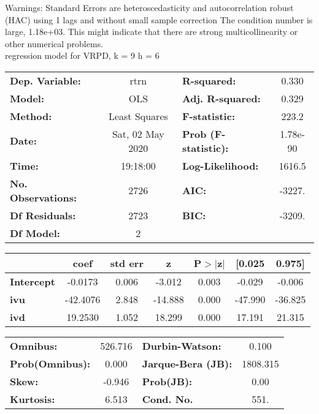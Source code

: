 Warnings: \newline
 [1] Standard Errors are heteroscedasticity and autocorrelation robust (HAC) using 1 lags and without small sample correction \newline
 [2] The condition number is large, 1.18e+03. This might indicate that there are \newline
 strong multicollinearity or other numerical problems.\\ 

regression model for VRPD, k = 9 h = 6\begin{center}
\begin{tabular}{lclc}
\toprule
\textbf{Dep. Variable:}    &       rtrn       & \textbf{  R-squared:         } &     0.330   \\
\textbf{Model:}            &       OLS        & \textbf{  Adj. R-squared:    } &     0.329   \\
\textbf{Method:}           &  Least Squares   & \textbf{  F-statistic:       } &     223.2   \\
\textbf{Date:}             & Sat, 02 May 2020 & \textbf{  Prob (F-statistic):} &  1.78e-90   \\
\textbf{Time:}             &     19:18:00     & \textbf{  Log-Likelihood:    } &    1616.5   \\
\textbf{No. Observations:} &        2726      & \textbf{  AIC:               } &    -3227.   \\
\textbf{Df Residuals:}     &        2723      & \textbf{  BIC:               } &    -3209.   \\
\textbf{Df Model:}         &           2      & \textbf{                     } &             \\
\bottomrule
\end{tabular}
\begin{tabular}{lcccccc}
                   & \textbf{coef} & \textbf{std err} & \textbf{z} & \textbf{P$> |$z$|$} & \textbf{[0.025} & \textbf{0.975]}  \\
\midrule
\textbf{Intercept} &      -0.0173  &        0.006     &    -3.012  &         0.003        &       -0.029    &       -0.006     \\
\textbf{ivu}       &     -42.4076  &        2.848     &   -14.888  &         0.000        &      -47.990    &      -36.825     \\
\textbf{ivd}       &      19.2530  &        1.052     &    18.299  &         0.000        &       17.191    &       21.315     \\
\bottomrule
\end{tabular}
\begin{tabular}{lclc}
\textbf{Omnibus:}       & 526.716 & \textbf{  Durbin-Watson:     } &    0.100  \\
\textbf{Prob(Omnibus):} &   0.000 & \textbf{  Jarque-Bera (JB):  } & 1808.315  \\
\textbf{Skew:}          &  -0.946 & \textbf{  Prob(JB):          } &     0.00  \\
\textbf{Kurtosis:}      &   6.513 & \textbf{  Cond. No.          } &     551.  \\
\bottomrule
\end{tabular}
\end{center}


